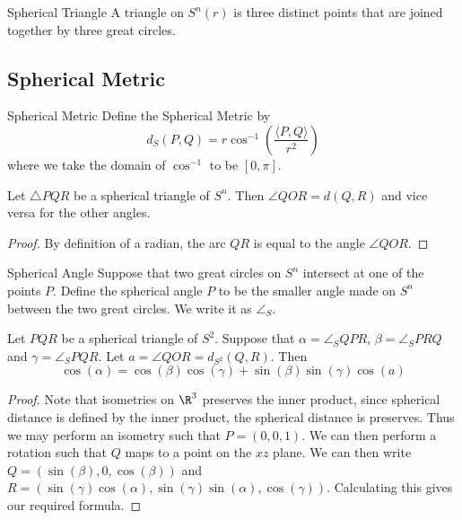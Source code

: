 \documentclass[a4paper]{article}
\begin{document}
\begin{defn}{Spherical Triangle}{} A triangle on $S^n(r)$ is three distinct points that are joined together by three great circles. 
\end{defn}

\subsection{Spherical Metric}
\begin{defn}{Spherical Metric}{} Define the Spherical Metric by $$d_S(P,Q)=r\cos^{-1}\left(\frac{\langle P,Q\rangle}{r^2}\right)$$ where we take the domain of $\cos^{-1}$ to be $[0,\pi]$. 
\end{defn}

\begin{prp}{}{} Let $\triangle PQR$ be a spherical triangle of $S^n$. Then $\angle QOR=d(Q,R)$ and vice versa for the other angles. \tcbline
\begin{proof} By definition of a radian, the arc $QR$ is equal to the angle $\angle QOR$. 
\end{proof}
\end{prp}

\begin{defn}{Spherical Angle}{} Suppose that two great circles on $S^n$ intersect at one of the points $P$. Define the spherical angle $P$ to be the smaller angle made on $S^n$ between the two great circles. We write it as $\angle_S$. 
\end{defn}

\begin{prp}{}{} Let $PQR$ be a spherical triangle of $S^2$. Suppose that $\alpha=\angle_SQPR$, $\beta=\angle_SPRQ$ and $\gamma=\angle_S PQR$. Let $a=\angle QOR=d_{S^2}(Q,R)$. Then $$\cos(\alpha)=\cos(\beta)\cos(\gamma)+\sin(\beta)\sin(\gamma)\cos(a)$$\tcbline
\begin{proof}
Note that isometries on $\R^3$ preserves the inner product, since spherical distance is defined by the inner product, the spherical distance is preserves. Thus we may perform an isometry such that $P=(0,0,1)$. We can then perform a  rotation such that $Q$ maps to a point on the $xz$ plane. We can then write $Q=(\sin(\beta), 0, \cos(\beta))$ and $R=(\sin(\gamma)\cos(\alpha), \sin(\gamma)\sin(\alpha), \cos(\gamma))$. Calculating this gives our required formula. 
\end{proof}
\end{prp}
\end{document}
